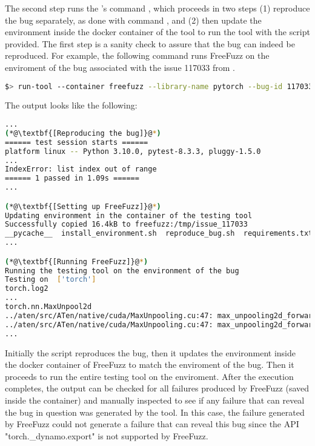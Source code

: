 \documentclass[sigconf,screen]{acmart}
\begin{document}
The second step runs the \tname's command , which
proceeds in two steps (1) reproduce the bug separately, as done with
command , and (2) then update the environment inside
the docker container of the tool to run the tool with the script
provided. The first step is a sanity check to assure that the bug can
indeed be reproduced. For example, the following command runs FreeFuzz
on the enviroment of the bug associated with the issue 117033 from
\torch.

\begin{lstlisting}[language=bash,keywords={}]
$> run-tool --container freefuzz --library-name pytorch --bug-id 117033 --run-script tool-integration/FreeFuzz/run_freefuzz_docker.sh
\end{lstlisting}

The output looks like the following:

\begin{lstlisting}[language=bash,keywords={}]
...  
(*@\textbf{[Reproducing the bug]}@*)
====== test session starts ======
platform linux -- Python 3.10.0, pytest-8.3.3, pluggy-1.5.0
...
IndexError: list index out of range
====== 1 passed in 1.09s ======
...

(*@\textbf{[Setting up FreeFuzz]}@*)
Updating environment in the container of the testing tool
Successfully copied 16.4kB to freefuzz:/tmp/issue_117033
__pycache__  install_environment.sh  reproduce_bug.sh  requirements.txt  test_issue_117033.py
...

(*@\textbf{[Running FreeFuzz]}@*)
Running the testing tool on the environment of the bug
Testing on  ['torch']
torch.log2
...
torch.nn.MaxUnpool2d
../aten/src/ATen/native/cuda/MaxUnpooling.cu:47: max_unpooling2d_forward_kernel: block: [0,0,0], thread: [1,0,0] Assertion `maxind >= 0 && maxind < outputImageSize` failed.
../aten/src/ATen/native/cuda/MaxUnpooling.cu:47: max_unpooling2d_forward_kernel: block: [0,0,0], thread: [2,0,0] Assertion `maxind >= 0 && maxind < outputImageSize` failed.
...
\end{lstlisting}

Initially the script reproduces the bug, then it updates the environment inside the docker container of FreeFuzz to match the enviroment of the bug. Then it proceeds to run the entire testing tool on the enviroment. After the execution completes, the output can be checked for all failures produced by FreeFuzz (saved inside the container) and manually inspected to see if any failure that can reveal the bug in question was generated by the tool. In this case, the failure generated by FreeFuzz could not generate a failure that can reveal this bug since the API "torch.\_dynamo.export" is not supported by FreeFuzz.
\end{document}

